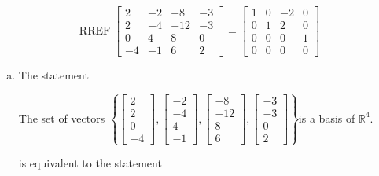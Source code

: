 \begin{exerciseAnswer} 


\[\operatorname{RREF} \left[\begin{array}{cccc}
2 & -2 & -8 & -3 \\
2 & -4 & -12 & -3 \\
0 & 4 & 8 & 0 \\
-4 & -1 & 6 & 2
\end{array}\right] = \left[\begin{array}{cccc}
1 & 0 & -2 & 0 \\
0 & 1 & 2 & 0 \\
0 & 0 & 0 & 1 \\
0 & 0 & 0 & 0
\end{array}\right] \]


\begin{enumerate}[(a)]
\item The statement 
\begin{center}\begin{minipage}{0.8\textwidth}
 The set of vectors \( \left\{ \left[\begin{array}{c}
2 \\
2 \\
0 \\
-4
\end{array}\right] , \left[\begin{array}{c}
-2 \\
-4 \\
4 \\
-1
\end{array}\right] , \left[\begin{array}{c}
-8 \\
-12 \\
8 \\
6
\end{array}\right] , \left[\begin{array}{c}
-3 \\
-3 \\
0 \\
2
\end{array}\right] \right\} \)is a basis of \(\mathbb{R}^4\). 
\end{minipage}\end{center}
     is equivalent to the statement 
\begin{center}\begin{minipage}{0.8\textwidth}
 The set of vectors \( \left\{ \left[\begin{array}{c}
2 \\
2 \\

\end{array}
\end{minipage}
\end{center}
\end{enumerate}
\end{exerciseAnswer}
